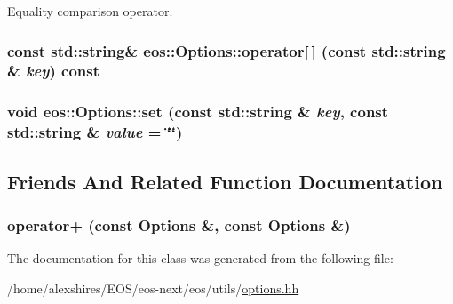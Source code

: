 Equality comparison operator. \hypertarget{classeos_1_1Options_a9095b57b9ffeccac5aad07412943bac9}{
\subsubsection[{operator[]}]{\setlength{\rightskip}{0pt plus 5cm}const std::string\& eos::Options::operator\mbox{[}$\,$\mbox{]} (const std::string \& {\em key}) const}}
\label{classeos_1_1Options_a9095b57b9ffeccac5aad07412943bac9}
\hypertarget{classeos_1_1Options_a677e5bc4a49af527471e7c6db4a4b953}{
\subsubsection[{set}]{\setlength{\rightskip}{0pt plus 5cm}void eos::Options::set (const std::string \& {\em key}, \/  const std::string \& {\em value} = {\ttfamily \char`\"{}\char`\"{}})}}
\label{classeos_1_1Options_a677e5bc4a49af527471e7c6db4a4b953}


\subsection{Friends And Related Function Documentation}
\hypertarget{classeos_1_1Options_a8a95ca0ac073107e9ec18e05a9ee6cce}{
\subsubsection[{operator+}]{ operator+ (const {\bf Options} \&, \/  const {\bf Options} \&)}}
\label{classeos_1_1Options_a8a95ca0ac073107e9ec18e05a9ee6cce}


The documentation for this class was generated from the following file:\begin{DoxyCompactItemize}
\item 
/home/alexshires/EOS/eos-\/next/eos/utils/\hyperlink{options_8hh}{options.hh}\end{DoxyCompactItemize}
